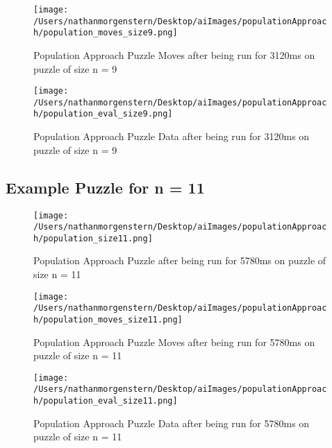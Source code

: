 \documentclass{report}
\begin{document}
	\begin{figure}[H]
	\centering
	\texttt{[image: /Users/nathanmorgenstern/Desktop/aiImages/populationApproach/population\_moves\_size9.png]}
	\caption{Population Approach Puzzle Moves after being run for 3120ms on puzzle of size n = 9}
	\label{fig: Population Approach Puzzle Moves after being run for 3120ms on puzzle of size n = 9}
	\end{figure}
	
	\begin{figure}[H]
	\centering
	\texttt{[image: /Users/nathanmorgenstern/Desktop/aiImages/populationApproach/population\_eval\_size9.png]}
	\caption{Population Approach Puzzle Data after being run for 3120ms on puzzle of size n = 9}
	\label{fig: Population Approach Puzzle Data after being run for 3120ms on puzzle of size n = 9}
	\end{figure}

\subsection{Example Puzzle for n = 11}

	\begin{figure}[H]
	\centering
	\texttt{[image: /Users/nathanmorgenstern/Desktop/aiImages/populationApproach/population\_size11.png]}
	\caption{Population Approach Puzzle after being run for 5780ms on puzzle of size n = 11}
	\label{fig: Population Approach Puzzle after being run for 5780ms on puzzle of size n = 11}
	\end{figure}
	
	\begin{figure}[H]
	\centering
	\texttt{[image: /Users/nathanmorgenstern/Desktop/aiImages/populationApproach/population\_moves\_size11.png]}
	\caption{Population Approach Puzzle Moves after being run for 5780ms on puzzle of size n = 11}
	\label{fig: Population Approach Puzzle Moves after being run for 5780ms on puzzle of size n = 11}
	\end{figure}
	
	\begin{figure}[H]
	\centering
	\texttt{[image: /Users/nathanmorgenstern/Desktop/aiImages/populationApproach/population\_eval\_size11.png]}
	\caption{Population Approach Puzzle Data after being run for 5780ms on puzzle of size n = 11}
	\label{fig: Population Approach Puzzle Data after being run for 5780ms on puzzle of size n = 11}
	\end{figure}
\end{document}
